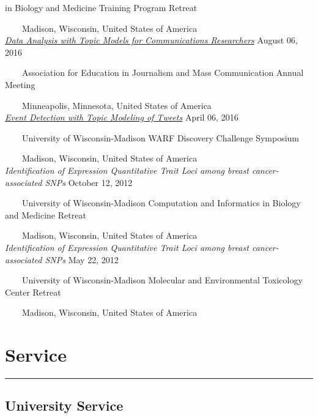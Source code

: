 \documentclass[
  10pt,
]
{article}
\begin{document}
in Biology and Medicine Training Program Retreat\\
\strut ~~~~Madison, Wisconsin, United States of America\\
\normalsize \href{https://figshare.com/articles/Data_Analysis_with_Topic_Models_for_Communications_Researchers/3545462}{\textit{Data Analysis with Topic Models for Communications Researchers}}
\hfill August 06, 2016\\
\strut ~~~~Association for Education in Journalism and Mass
Communication Annual Meeting\\
\strut ~~~~Minneapolis, Minnesota, United States of America\\
\normalsize \href{https://figshare.com/articles/Event_Detection_with_Topic_Modeling_of_Tweets/3545468}{\textit{Event Detection with Topic Modeling of Tweets}}
\hfill April 06, 2016\\
\strut ~~~~University of Wisconsin-Madison WARF Discovery Challenge
Symposium\\
\strut ~~~~Madison, Wisconsin, United States of America\\
\normalsize \textit{Identification of Expression Quantitative Trait Loci among breast cancer-associated SNPs}
\hfill October 12, 2012\\
\strut ~~~~University of Wisconsin-Madison Computation and Informatics
in Biology and Medicine Retreat\\
\strut ~~~~Madison, Wisconsin, United States of America\\
\normalsize \textit{Identification of Expression Quantitative Trait Loci among breast cancer-associated SNPs}
\hfill May 22, 2012\\
\strut ~~~~University of Wisconsin-Madison Molecular and Environmental
Toxicology Center Retreat\\
\strut ~~~~Madison, Wisconsin, United States of America

\section{Service}\label{service}

\hrule

\subsection{University Service}\label{university-service}
\end{document}
